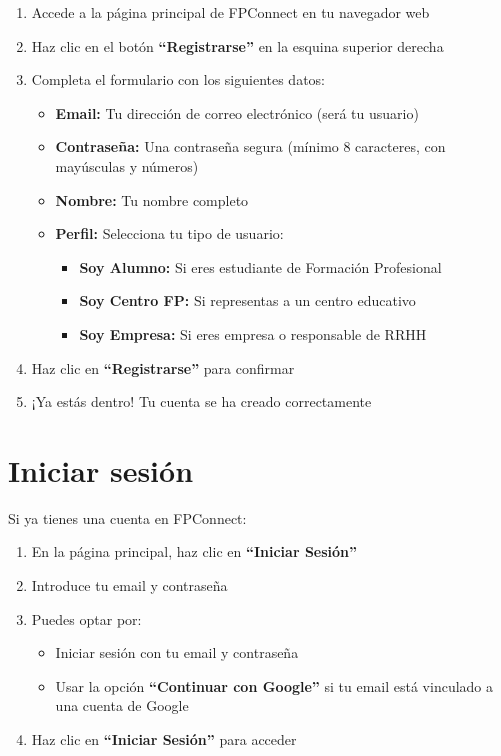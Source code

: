 \documentclass[a4paper]{report}
\begin{document}
\begin{enumerate}
  \item Accede a la página principal de FPConnect en tu navegador web
  \item Haz clic en el botón \textbf{``Registrarse''} en la esquina superior derecha
  \item Completa el formulario con los siguientes datos:
  \begin{itemize}
    \item \textbf{Email:} Tu dirección de correo electrónico (será tu usuario)
    \item \textbf{Contraseña:} Una contraseña segura (mínimo 8 caracteres, con mayúsculas y números)
    \item \textbf{Nombre:} Tu nombre completo
    \item \textbf{Perfil:} Selecciona tu tipo de usuario:
    \begin{itemize}
      \item \textbf{Soy Alumno:} Si eres estudiante de Formación Profesional
      \item \textbf{Soy Centro FP:} Si representas a un centro educativo
      \item \textbf{Soy Empresa:} Si eres empresa o responsable de RRHH
    \end{itemize}
  \end{itemize}
  \item Haz clic en \textbf{``Registrarse''} para confirmar
  \item ¡Ya estás dentro! Tu cuenta se ha creado correctamente
\end{enumerate}

\section{Iniciar sesión}

Si ya tienes una cuenta en FPConnect:

\begin{enumerate}
  \item En la página principal, haz clic en \textbf{``Iniciar Sesión''}
  \item Introduce tu email y contraseña
  \item Puedes optar por:
  \begin{itemize}
    \item Iniciar sesión con tu email y contraseña
    \item Usar la opción \textbf{``Continuar con Google''} si tu email está vinculado a una cuenta de Google
  \end{itemize}
  \item Haz clic en \textbf{``Iniciar Sesión''} para acceder
\end{enumerate}
\end{document}
